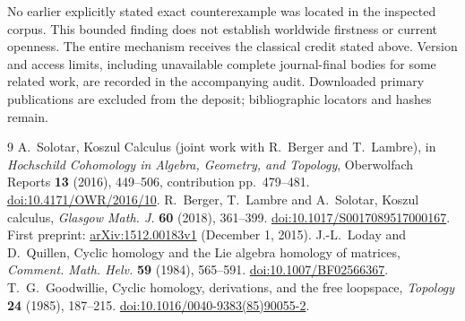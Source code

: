 \documentclass[10pt]{article}
\begin{document}
No earlier explicitly stated exact counterexample was located in the
inspected corpus. This bounded finding does not establish worldwide
firstness or current openness. The entire mechanism receives the
classical credit stated above. Version and access limits, including
unavailable complete journal-final bodies for some related work,
are recorded in the accompanying audit. Downloaded primary publications
are excluded from the deposit; bibliographic locators and hashes remain.

\begin{thebibliography}{9}
A.~Solotar, Koszul Calculus (joint work with R.~Berger and T.~Lambre),
in \emph{Hochschild Cohomology in Algebra, Geometry, and Topology},
Oberwolfach Reports \textbf{13} (2016), 449--506,
contribution pp.~479--481.
\href{https://doi.org/10.4171/OWR/2016/10}{doi:10.4171/OWR/2016/10}.
R.~Berger, T.~Lambre and A.~Solotar, Koszul calculus,
\emph{Glasgow Math. J.} \textbf{60} (2018), 361--399.
\href{https://doi.org/10.1017/S0017089517000167}{doi:10.1017/S0017089517000167}.
First preprint: \href{https://arxiv.org/abs/1512.00183v1}{arXiv:1512.00183v1}
(December 1, 2015).
J.-L.~Loday and D.~Quillen,
Cyclic homology and the Lie algebra homology of matrices,
\emph{Comment. Math. Helv.} \textbf{59} (1984), 565--591.
\href{https://doi.org/10.1007/BF02566367}{doi:10.1007/BF02566367}.
T.~G.~Goodwillie, Cyclic homology, derivations, and the free loopspace,
\emph{Topology} \textbf{24} (1985), 187--215.
\href{https://doi.org/10.1016/0040-9383(85)90055-2}{doi:10.1016/0040-9383(85)90055-2}.
\end{thebibliography}
\end{document}

